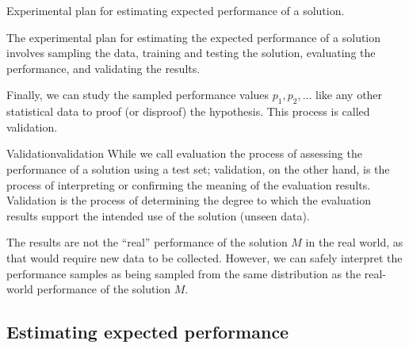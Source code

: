\begin{figurebox}[label=fig:plan-single]{Experimental plan for estimating expected performance of a solution.}
  \tcblower
  The experimental plan for estimating the expected performance of a solution involves
  sampling the data, training and testing the solution, evaluating the performance, and
  validating the results.
\end{figurebox}

Finally, we can study the sampled performance values $p_1, p_2, \ldots$ like any other
statistical data to proof (or disproof) the hypothesis.  This process is called
validation.

\begin{defbox}{Validation}{validation}
  While we call evaluation the process of assessing the performance of a solution using a
  test set; validation, on the other hand, is the process of interpreting or confirming
  the meaning of the evaluation results.  Validation is the process of determining the
  degree to which the evaluation results support the intended use of the solution (unseen
  data).
\end{defbox}

The results are not the ``real'' performance of the solution
$M$ in the real world, as that would require new data to be collected.  However, we can
safely interpret the performance samples as being sampled from the same distribution as
the real-world performance of the solution $M$.


\subsection{Estimating expected performance}
\label{sub:expected-performance}


